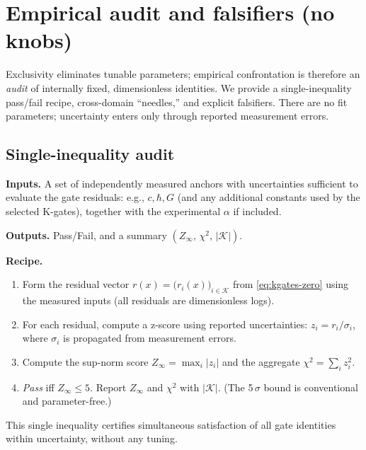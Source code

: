 \documentclass[11pt]{article}
\begin{document}
\section{Empirical audit and falsifiers (no knobs)}
Exclusivity eliminates tunable parameters; empirical confrontation is therefore an \emph{audit} of internally fixed, dimensionless identities. We provide a single\mbox{-}inequality pass/fail recipe, cross\mbox{-}domain ``needles,'' and explicit falsifiers. There are no fit parameters; uncertainty enters only through reported measurement errors.

\subsection{Single\mbox{-}inequality audit}
\textbf{Inputs.} A set of independently measured anchors with uncertainties sufficient to evaluate the gate residuals: e.g., \(c,\hbar,G\) (and any additional constants used by the selected K\mbox{-}gates), together with the experimental \(\alpha\) if included.

\textbf{Outputs.} Pass/Fail, and a summary \((Z_\infty,\, \chi^2,\, |\mathcal{K}|)\).

\textbf{Recipe.}
\begin{enumerate}
  \item Form the residual vector \(r(x)=\bigl(r_i(x)\bigr)_{i\in\mathcal{K}}\) from \eqref{eq:kgates-zero} using the measured inputs (all residuals are dimensionless logs).
  \item For each residual, compute a z\mbox{-}score using reported uncertainties: \(z_i = r_i/\sigma_i\), where \(\sigma_i\) is propagated from measurement errors.
  \item Compute the sup\mbox{-}norm score \(Z_\infty=\max_i |z_i|\) and the aggregate \(\chi^2=\sum_i z_i^2\).
  \item \emph{Pass} iff \(Z_\infty \le 5\). Report \(Z_\infty\) and \(\chi^2\) with \(|\mathcal{K}|\). (The 5\,\(\sigma\) bound is conventional and parameter\mbox{-}free.)
\end{enumerate}
This single inequality certifies simultaneous satisfaction of all gate identities within uncertainty, without any tuning.
\end{document}
